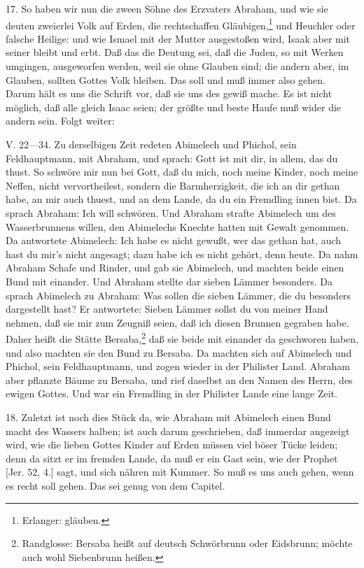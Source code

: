 17. So haben wir nun die zween Söhne des Erzvaters Abraham, und wie sie deuten zweierlei Volk auf Erden, die rechtschaffen Gläubigen,\footnote{Erlanger: gläuben.} und Heuchler oder falsche Heilige: und wie Ismael mit der Mutter ausgestoßen wird, Isaak aber mit seiner bleibt und erbt. Daß das die Deutung sei, daß die Juden, so mit Werken umgingen, ausgeworfen werden, weil sie ohne Glauben sind; die andern aber, im Glauben, sollten Gottes Volk bleiben. Das soll und muß immer also gehen. Darum hält es uns die Schrift vor, daß sie uns des gewiß mache. Es ist nicht
möglich, daß alle gleich Isaac seien; der größte und beste Haufe muß wider die andern sein. Folgt weiter:

V. 22—34. Zu derselbigen Zeit redeten Abimelech und Phichol, sein Feldhauptmann, mit Abraham, und sprach: Gott ist mit dir, in allem, das du thust. So schwöre mir nun bei Gott, daß du mich, noch meine Kinder, noch meine Neffen, nicht vervortheilest, sondern die Barmherzigkeit, die ich an dir gethan habe, an mir auch thuest, und an dem Lande, da du ein Fremdling innen bist. Da sprach Abraham: Ich will schwören. Und Abraham strafte Abimelech um des Wasserbrunnens willen, den Abimelechs Knechte hatten mit Gewalt genommen. Da antwortete Abimelech: Ich habe es nicht gewußt, wer das gethan hat, auch hast du mir’s nicht angesagt; dazu habe ich es nicht gehört, denn heute. Da nahm Abraham Schafe und Rinder, und gab sie Abimelech, und machten beide einen Bund mit einander. Und Abraham stellte dar sieben Lämmer besonders. Da sprach Abimelech zu Abraham: Was sollen die sieben Lämmer, die du besonders dargestellt hast? Er antwortete: Sieben Lämmer sollst du von meiner Hand nehmen, daß sie mir zum Zeugniß seien, daß ich diesen Brunnen gegraben habe. Daher heißt die Stätte Bersaba,\footnote{Randglosse: Bersaba heißt auf deutsch Schwörbrunn oder Eidsbrunn; möchte auch wohl Siebenbrunn heißen.} daß sie beide mit einander da geschworen haben, und also machten sie den Bund zu Bersaba. Da machten sich auf Abimelech und Phichol, sein Feldhauptmann, und zogen wieder in der Philister Land. Abraham aber pflanzte Bäume zu Bersaba, und rief daselbst an den Namen des Herrn, des ewigen Gottes. Und war ein Fremdling in der Philister Lande eine lange Zeit.

18. Zuletzt ist noch dies Stück da, wie Abraham mit Abimelech einen Bund macht des Wassers halben; ist auch darum geschrieben, daß immerdar angezeigt wird, wie die lieben Gottes Kinder auf Erden müssen viel böser Tücke leiden; denn da sitzt er im fremden Lande, da muß er ein Gast sein, wie der Prophet [Jer. 52, 4.] sagt, und sich nähren mit Kummer. So muß es uns auch gehen, wenn es recht soll gehen. Das sei genug von dem Capitel.

